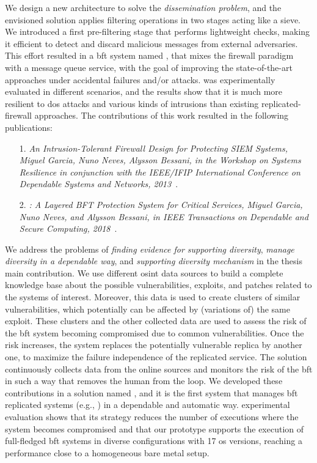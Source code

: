 We design a new architecture to solve the \emph{dissemination problem}, and the envisioned solution applies filtering operations in two stages acting like a sieve.
We introduced a first pre-filtering stage that performs lightweight checks, making it efficient to detect and discard malicious messages from external adversaries.
This effort resulted in a \gls{bft} system named \sieveq, that mixes the firewall paradigm with a message queue service, with the goal of improving the state-of-the-art approaches under accidental failures and/or attacks. 
\sieveq was experimentally evaluated in different scenarios, and the results show that it is much more resilient to \gls{dos} attacks and various kinds of intrusions than existing replicated-firewall approaches.
The contributions of this work resulted in the following publications:

\begin{enumerate}
\item[1.] \emph{An Intrusion-Tolerant Firewall Design for Protecting SIEM Systems, Miguel Garcia, Nuno Neves, Alysson Bessani, in the Workshop on Systems Resilience in conjunction with the IEEE/IFIP International Conference on Dependable Systems and Networks, 2013}~\cite{Garcia:2013}.

\item[2.] \emph{\sieveq: A Layered BFT Protection System for Critical Services, Miguel Garcia, Nuno Neves, and Alysson Bessani, in IEEE Transactions on Dependable and Secure Computing, 2018}~\cite{Garcia:2016}.
\end{enumerate}


We address the problems of \emph{finding evidence for supporting diversity}, \emph{manage diversity in a dependable way}, and \emph{supporting diversity mechanism} in the thesis main contribution.
We use different \gls{osint} data sources to build a complete knowledge base about the possible vulnerabilities, exploits, and patches related to the systems of interest. 
Moreover, this data is used to create clusters of similar vulnerabilities, which potentially can be affected by (variations of) the same exploit. 
These clusters and the other collected data are used to assess the risk of the \gls{bft} system becoming compromised due to common vulnerabilities.
Once the risk increases, the system replaces the potentially vulnerable replica by another one, to maximize the failure independence of the replicated service.
The solution continuously collects data from the online sources and monitors the risk of the \gls{bft} in such a way that removes the human from the loop.
We developed these contributions in a solution named \system, and it is the first system that manages \gls{bft} replicated systems (e.g., \sieveq) in a dependable and automatic way.
\system experimental evaluation shows that its strategy reduces the number of executions where the system becomes compromised and that our prototype supports the execution of full-fledged \gls{bft} systems in diverse configurations with 17 \gls{os} versions, reaching a performance close to a homogeneous bare metal setup. 



